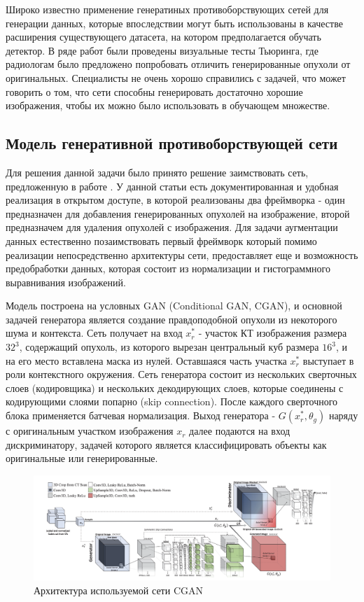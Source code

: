Широко известно применение генератиных противоборствующих сетей для генерации данных, которые впоследствии могут быть использованы в качестве расширения существующего датасета, на котором предполагается обучать детектор. В ряде работ были проведены визуальные тесты Тьюринга, где радиологам было предложено попробовать отличить генерированные опухоли от оригинальных. Специалисты не очень хорошо справились с задачей, что может говорить о том, что сети способны генерировать достаточно хорошие изображения, чтобы их можно было использовать в обучающем множестве.

\subsection{Модель генеративной противоборствующей сети}

Для решения данной задачи было принято решение заимствовать сеть, предложенную в работе \cite{mirsky}. У данной статьи есть документированная и удобная реализация в открытом доступе, в которой реализованы два фреймворка - один предназначен для добавления генерированных опухолей на изображение, второй предназначем для удаления опухолей с изображения. Для задачи аугментации данных естественно позаимствовать первый фреймворк который помимо реализации непосредственно архитектуры сети, предоставляет еще и возможность предобработки данных, которая состоит из нормализации и гистограммного выравнивания изображений.

Модель построена на условных GAN (Conditional GAN, CGAN), и основной задачей генератора является создание правдоподобной опухоли из некоторого шума и контекста. Сеть получает на вход $x_r^*$ - участок КТ изображения размера $32^3$, содержащий опухоль, из которого вырезан центральный куб размера $16^3$, и на его место вставлена маска из нулей. Оставшаяся часть участка $x_r^*$ выступает в роли контекстного окружения. Сеть генератора состоит из нескольких сверточных слоев (кодировщика) и нескольких декодирующих слоев, которые соединены с кодирующими слоями попарно (skip connection). После каждого сверточного блока применяется батчевая нормализация. Выход генератора - $G(x_r^*, \theta_g)$ наряду с оригинальным участком изображения $x_r$ далее подаются на вход дискриминатору, задачей которого является классифицировать объекты как оригинальные или генерированные.

\begin{figure}[!h]
\includegraphics[width=\linewidth]{mirskiy-cgan-architecture.png}
\caption{Архитектура используемой сети CGAN}\label{mirskiy-cgan-architecture}
\centering
\end{figure}

